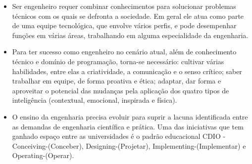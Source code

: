 \documentclass{article}
\begin{document}
\begin{itemize}
    \item Ser engenheiro requer combinar conhecimentos para solucionar problemas técnicos com os quais se defronta a sociedade. Em geral ele atua como parte de uma equipe tecnológica, que envolve vários perfis, e pode desempenhar funções em várias áreas, trabalhando em alguma especialidade da engenharia.
    \item Para ter sucesso como engenheiro no cenário atual, além de conhecimento técnico e domínio de programação, torna-se necessário: cultivar várias habilidades, entre elas a criatividade, a comunicação e o senso crítico; saber trabalhar em equipe, de forma proativa e ética; adaptar, dar forma e aproveitar o potencial das mudanças pela aplicação dos quatro tipos de inteligência (contextual, emocional, inspirada e física).
    \item O ensino da engenharia precisa evoluir para suprir a lacuna identificada entre as demandas de engenharia científica e prática. Uma das iniciativas que tem ganhado espaço entre as universidades é o padrão educacional CDIO - Conceiving-(Conceber), Designing-(Projetar), Implementing-(Implementar) e Operating-(Operar).
\end{itemize}
\end{document}
